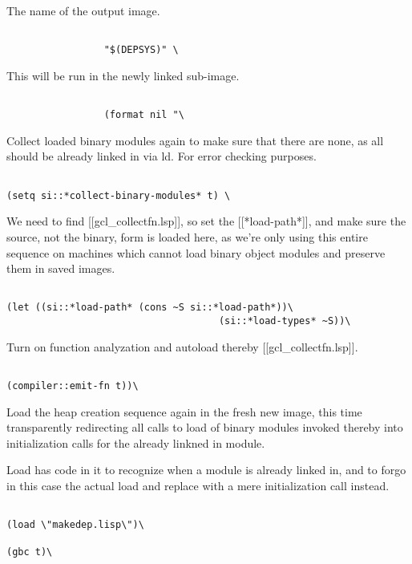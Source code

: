 \documentclass{article}
\begin{document}
The name of the output image.
\begin{verbatim}

				 "$(DEPSYS)" \

\end{verbatim}

This will be run in the newly linked sub-image.
\begin{verbatim}

				 (format nil "\

\end{verbatim}

Collect loaded binary modules again to make sure that there are none,
as all should be already linked in via ld.  For error checking
purposes.
\begin{verbatim}

(setq si::*collect-binary-modules* t) \

\end{verbatim}

We need to find [[gcl_collectfn.lsp]], so set the [[*load-path*]], and make
sure the source, not the binary, form is loaded here, as we're only
using this entire sequence on machines which cannot load binary object
modules and preserve them in saved images.
\begin{verbatim}

(let ((si::*load-path* (cons ~S si::*load-path*))\
                                     (si::*load-types* ~S))\

\end{verbatim}

Turn on function analyzation and autoload thereby [[gcl_collectfn.lsp]].
\begin{verbatim}

(compiler::emit-fn t))\

\end{verbatim}

Load the heap creation sequence again in the fresh new image, this
time transparently redirecting all calls to load of binary modules
invoked thereby into initialization calls for the already linkned in
module.

Load has code in it to recognize when a module is already linked in,
and to forgo in this case the actual load and replace with a mere
initialization call instead.
\begin{verbatim}

(load \"makedep.lisp\")\

(gbc t)\

\end{verbatim}
\end{document}
